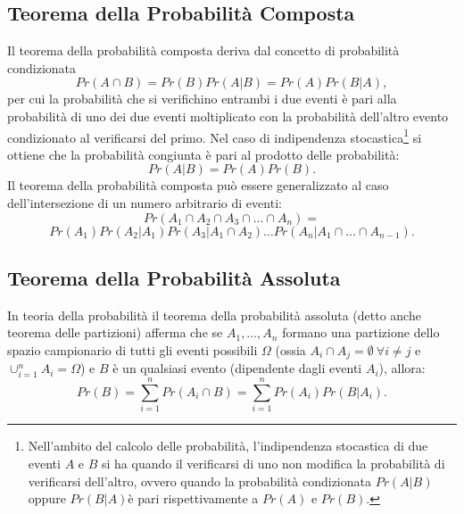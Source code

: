 \documentclass[12pt,oneside,openany]{memoir}
\numberwithin{equation}{subsection}
\begin{document}
\subsection{Teorema della Probabilit\`a Composta}
Il teorema della probabilit\`a composta deriva dal concetto di probabilit\`a
condizionata
\begin{equation}
    Pr(A \cap B) = Pr(B) Pr(A|B) = Pr(A) Pr(B|A),
\end{equation}
per cui la probabilit\`a che si verifichino entrambi i due eventi \`e pari alla
probabilit\`a di uno dei due eventi moltiplicato con la probabilit\`a dell'altro
evento condizionato al verificarsi del primo.
\bigbreak\noindent
Nel caso di indipendenza stocastica\footnote{Nell'ambito del calcolo delle
probabilit\`a, l'indipendenza stocastica di due eventi $A$ e $B$ si ha quando il
verificarsi di uno non modifica la probabilit\`a di verificarsi dell'altro,
ovvero quando la probabilit\`a condizionata $Pr(A | B)$ oppure $Pr(B | A)$\`e
pari rispettivamente a $Pr(A)$ e $Pr(B)$.} si ottiene che la probabilit\`a
congiunta \`e pari al prodotto delle probabilit\`a:
\begin{equation}
    Pr(A|B) = Pr(A) Pr(B).
\end{equation}
\bigbreak\noindent
Il teorema della probabilit\`a composta può essere generalizzato al caso
dell'intersezione di un numero arbitrario di eventi:
\begin{equation}
    Pr(A_1 \cap A_2 \cap A_3 \cap \dots \cap A_n) =
\end{equation}
\[
    Pr(A_1) Pr(A_2 | A_1) Pr(A_3 | A_1 \cap A_2) \dots Pr(A_n | A_1 \cap \dots
    \cap A_{n-1}).
\]


\subsection{Teorema della Probabilit\`a Assoluta}
In teoria della probabilit\`a il teorema della probabilit\`a assoluta (detto 
anche teorema delle partizioni) afferma che se $A_1, \dots, A_n$ formano una
partizione dello spazio campionario di tutti gli eventi possibili $\Omega$
(ossia $A_i \cap A_j = \emptyset \ \forall i \neq j$ e $\cup_{i = 1}^{n} A_i =
\Omega$) e $B$ \`e un qualsiasi evento (dipendente dagli eventi $A_i$), allora:
\begin{equation}
    Pr(B) = \sum_{i = 1}^{n} Pr(A_i \cap B) = \sum_{i = 1}^{n} Pr(A_i)
    Pr(B | A_i).
\end{equation}
\end{document}
